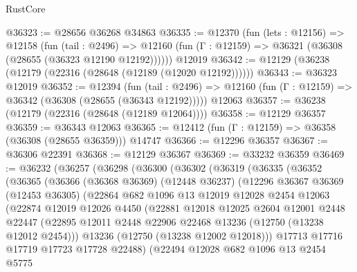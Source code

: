 \begin{lexlean}{RustCore}
\begin{coremodule}
@36323 := @28656 @36268 @34863
@36335 := @12370
    (fun (lets : @12156) =>
    @12158
      (fun (tail : @2496) =>
      @12160 (fun (Γ : @12159) => @36321 (@36308 (@28655 (@36323 @12190 @12192))))))
    @12019
@36342 := @12129 (@36238 (@12179 (@22316 (@28648 (@12189 (@12020 @12192))))))
@36343 := @36323 @12019
@36352 := @12394
    (fun (tail : @2496) => @12160 (fun (Γ : @12159) => @36342 (@36308 (@28655 (@36343 @12192)))))
    @12063
@36357 := @36238 (@12179 (@22316 (@28648 (@12189 @12064))))
@36358 := @12129 @36357
@36359 := @36343 @12063
@36365 := @12412 (fun (Γ : @12159) => @36358 (@36308 (@28655 @36359))) @14747
@36366 := @12296 @36357
@36367 := @36306 @22391
@36368 := @12129 @36367
@36369 := @33232 @36359
@36469 := @36232
    (@36257
      (@36298
        (@36300
          (@36302
            (@36319
              (@36335
                (@36352
                  (@36365
                    (@36366
                      (@36368 @36369)
                      (@12448 @36237)
                      (@12296
                        @36367
                        @36369
                        (@12453 @36305)
                        (@22864
                          @682
                          @1096
                          @13
                          @12019
                          @12028
                          @2454
                          @12063
                          (@22874
                            @12019
                            @12026
                            @4450
                            (@22881
                              @12018
                              @12025
                              @2604
                              @12001
                              @2448
                              @22447
                              (@22895
                                @12011
                                @2448
                                @22906
                                @22468
                                @13236
                                (@12750 (@13238 @12012 @2454)))
                              @13236
                              (@12750 (@13238 @12002 @12018)))
                            @17713
                            @17716
                            @17719
                            @17723
                            @17728
                            @22488)
                          (@22494
                            @12028
                            @682
                            @1096
                            @13
                            @2454
                            @5775

\end{coremodule}
\end{lexlean}
